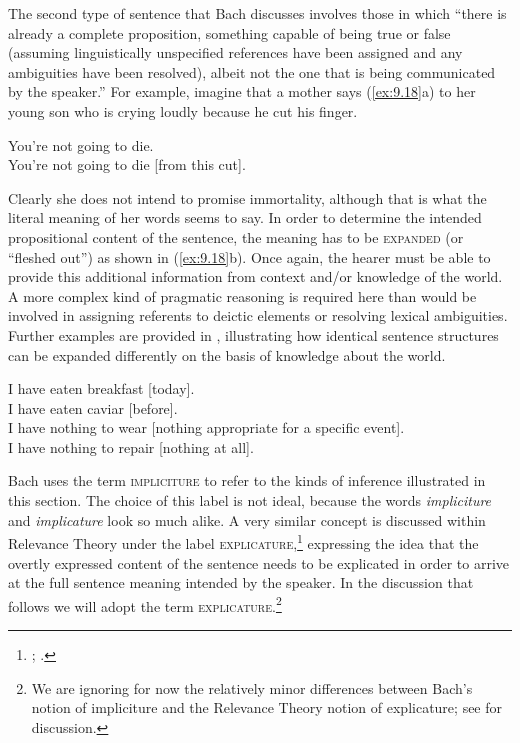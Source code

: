 \ea \label{ex:9.16}
                       \z
\z

\ea \label{ex:9.17}
                       \z
\z


The second type of sentence that Bach discusses involves those in which “there is already a complete proposition, something capable of being true or false (assuming linguistically unspecified references have been assigned and any ambiguities have been resolved), albeit not the one that is being communicated by the speaker.” For example, imagine that a mother says (\ref{ex:9.18}a) to her young son who is crying loudly because he cut his finger.


\ea \label{ex:9.18}
\ea You’re not going to die.\\
\ex You’re not going to die [from this cut].
                       \z
\z


Clearly she does not intend to promise immortality, although that is what the literal meaning of her words seems to say. In order to determine the intended propositional content of the sentence, the meaning has to be \textsc{expanded} (or “fleshed out”) as shown in (\ref{ex:9.18}b). Once again, the hearer must be able to provide this additional information from context and/or knowledge of the world. A more complex kind of pragmatic reasoning is required here than would be involved in assigning referents to deictic elements or resolving lexical ambiguities. Further examples are provided in , illustrating how identical sentence structures can be expanded differently on the basis of knowledge about the world.


\ea \label{ex:9.19}
\ea I have eaten breakfast [today].\\
\ex I have eaten caviar [before].\\
\ex I have nothing to wear [nothing appropriate for a specific event].\\
\ex I have nothing to repair [nothing at all].
                       \z
\z


Bach uses the term \textsc{impliciture} to refer to the kinds of inference illustrated in this section. The choice of this label is not ideal, because the words \textit{impliciture} and \textit{implicature} look so much alike. A very similar concept is discussed within Relevance Theory under the label \textsc{explicature},\footnote{\citet{SperberWilson1986}; \citet{Carston1988}.} expressing the idea that the overtly expressed content of the sentence needs to be explicated in order to arrive at the full sentence meaning intended by the speaker. In the discussion that follows we will adopt the term \textsc{explicature}.\footnote{We are ignoring for now the relatively minor differences between Bach’s notion of impliciture and the Relevance Theory notion of explicature; see \citet{Bach2010} for discussion.}



